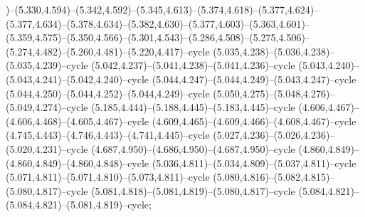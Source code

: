 )--(5.330,4.594)--(5.342,4.592)--(5.345,4.613)--(5.374,4.618)--(5.377,4.624)--(5.377,4.634)--(5.378,4.634)--(5.382,4.630)--(5.377,4.603)--(5.363,4.601)--(5.359,4.575)--(5.350,4.566)--(5.301,4.543)--(5.286,4.508)--(5.275,4.506)--(5.274,4.482)--(5.260,4.481)--(5.220,4.417)--cycle (5.035,4.238)--(5.036,4.238)--(5.035,4.239)--cycle (5.042,4.237)--(5.041,4.238)--(5.041,4.236)--cycle (5.043,4.240)--(5.043,4.241)--(5.042,4.240)--cycle (5.044,4.247)--(5.044,4.249)--(5.043,4.247)--cycle (5.044,4.250)--(5.044,4.252)--(5.044,4.249)--cycle (5.050,4.275)--(5.048,4.276)--(5.049,4.274)--cycle (5.185,4.444)--(5.188,4.445)--(5.183,4.445)--cycle (4.606,4.467)--(4.606,4.468)--(4.605,4.467)--cycle (4.609,4.465)--(4.609,4.466)--(4.608,4.467)--cycle (4.745,4.443)--(4.746,4.443)--(4.741,4.445)--cycle (5.027,4.236)--(5.026,4.236)--(5.020,4.231)--cycle (4.687,4.950)--(4.686,4.950)--(4.687,4.950)--cycle (4.860,4.849)--(4.860,4.849)--(4.860,4.848)--cycle (5.036,4.811)--(5.034,4.809)--(5.037,4.811)--cycle (5.071,4.811)--(5.071,4.810)--(5.073,4.811)--cycle (5.080,4.816)--(5.082,4.815)--(5.080,4.817)--cycle (5.081,4.818)--(5.081,4.819)--(5.080,4.817)--cycle (5.084,4.821)--(5.084,4.821)--(5.081,4.819)--cycle;
